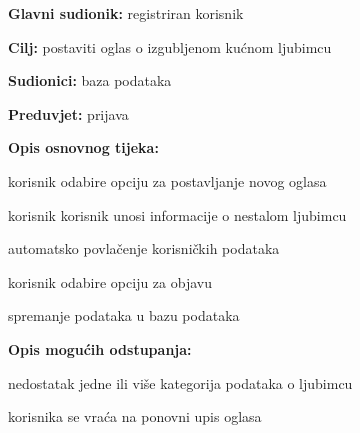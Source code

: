 					\noindent {}
					\begin{packed_item}
						
						\item \textbf{Glavni sudionik: } registriran korisnik
						\item  \textbf{Cilj:} postaviti oglas o izgubljenom kućnom ljubimcu
						\item  \textbf{Sudionici:} baza podataka
						\item  \textbf{Preduvjet:} prijava
						\item  \textbf{Opis osnovnog tijeka:}
						
						\item[] \begin{packed_enum}
							
							\item korisnik odabire opciju za postavljanje novog oglasa
							\item korisnik korisnik unosi informacije o nestalom ljubimcu
							\item automatsko povlačenje korisničkih podataka
							\item korisnik odabire opciju za objavu
							\item spremanje podataka u bazu podataka
						\end{packed_enum}
						
						\item  \textbf{Opis mogućih odstupanja:}
						
						\item[] \begin{packed_item}
							
							\item[4.a] nedostatak jedne ili više kategorija podataka o ljubimcu
							\item[] \begin{packed_enum}
								\item korisnika se vraća na ponovni upis oglasa
							\end{packed_enum}
							
						\end{packed_item}
					\end{packed_item}
					
